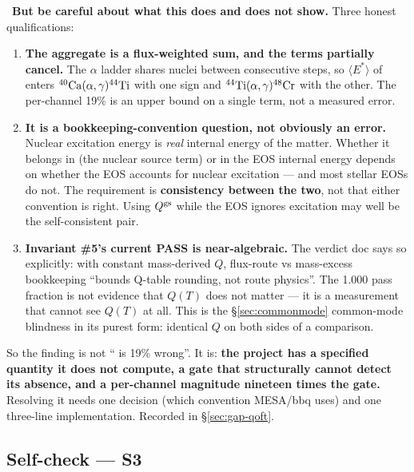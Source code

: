 \begin{warn}
\warnglyph{}~\textbf{But be careful about what this does and does not show.}
Three honest qualifications:

\begin{enumerate}
\item \textbf{The aggregate is a flux-weighted sum, and the terms partially
      cancel.} The $\alpha$ ladder shares nuclei between consecutive steps, so
      $\langle E^*\rangle$ of  enters
      $\nuc{Ca}{40}(\alpha,\gamma)\nuc{Ti}{44}$ with one sign and
      $\nuc{Ti}{44}(\alpha,\gamma)\nuc{Cr}{48}$ with the other. The per-channel
      19\% is an upper bound on a single term, not a measured \enuc{} error.
\item \textbf{It is a bookkeeping-convention question, not obviously an error.}
      Nuclear excitation energy is \emph{real} internal energy of the matter.
      Whether it belongs in \enuc{} (the nuclear source term) or in the EOS
      internal energy depends on whether the EOS accounts for nuclear excitation
      --- and most stellar EOSs do not. The requirement is
      \textbf{consistency between the two}, not that either convention is right.
      Using $Q^{\rm gs}$ while the EOS ignores excitation may well be the
      self-consistent pair.
\item \textbf{Invariant \#5's current PASS is near-algebraic.} The verdict doc
      says so explicitly: with constant mass-derived $Q$, flux-route vs
      mass-excess bookkeeping ``bounds Q-table rounding, not route physics''.
      The 1.000 pass fraction is not evidence that $Q(T)$ does not matter --- it
      is a measurement that cannot see $Q(T)$ at all. This is the
      \S\ref{sec:commonmode} common-mode blindness in its purest form: identical
      $Q$ on both sides of a comparison.
\end{enumerate}
\end{warn}

So the finding is not ``\enuc{} is 19\% wrong''. It is: \textbf{the project has
a specified quantity it does not compute, a gate that structurally cannot detect
its absence, and a per-channel magnitude nineteen times the gate.} Resolving it
needs one decision (which convention MESA/bbq uses) and one three-line
implementation. Recorded in \S\ref{sec:gap-qoft}.

\subsection*{Self-check --- S3}
\label{sec:selfcheck-db}

